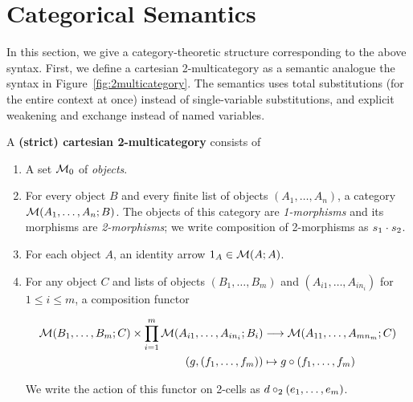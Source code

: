 \section{Categorical Semantics}

In this section, we give a category-theoretic structure corresponding to
the above syntax.  First, we define a cartesian 2-multicategory as a
semantic analogue the syntax in Figure~\ref{fig:2multicategory}. The
semantics uses total substitutions (for the entire context at once)
instead of single-variable substitutions, and explicit weakening and
exchange instead of named variables.

\begin{definition}
  A \textbf{(strict) cartesian 2-multicategory} consists of
  \begin{enumerate}
  \item A set $\mathcal{M}_0$ of \emph{objects}.
  \item For every object $B$ and every finite list of objects $(A_1,\dots,A_n)$, a category $\mathcal{M}(A_1,\dots,A_n;B)$.
    The objects of this category are \emph{1-morphisms} and its morphisms are \emph{2-morphisms}; we write composition of 2-morphisms as $s_1 \cdot s_2$.
  \item For each object $A$, an identity arrow $1_A\in\mathcal{M}(A;A)$.
  \item For any object $C$ and lists of objects $(B_1,\dots,B_m)$ and $(A_{i1},\dots,A_{in_i})$ for $1\le i\le m$, a composition functor
    \begin{footnotesize}
    \begin{align*}
      \mathcal{M}(B_1,\dots,B_m;C) \times \prod_{i=1}^m \mathcal{M}(A_{i1},\dots,A_{in_i};B_i) &\longrightarrow \mathcal{M}(A_{11},\dots,A_{mn_m};C)\\
      (g,(f_1,\dots,f_m)) &\mapsto g\circ (f_1,\dots,f_m)
    \end{align*}
    \end{footnotesize}
    We write the action of this functor on 2-cells as $d \mathbin{\circ_2} (e_1,\dots,e_m)$.

\end{enumerate}
\end{definition}
